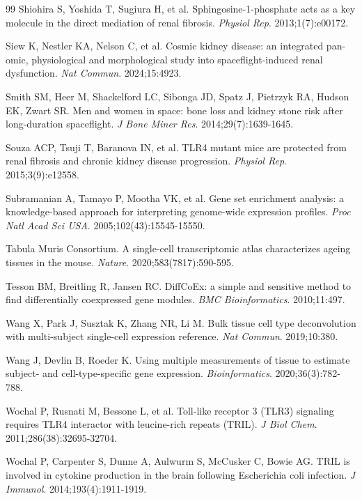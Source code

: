 \documentclass[11pt]{article}
\begin{document}
\begin{thebibliography}{99}
 Shiohira S, Yoshida T, Sugiura H, et al. Sphingosine-1-phosphate acts as a key molecule in the direct mediation of renal fibrosis. \emph{Physiol Rep}. 2013;1(7):e00172.

 Siew K, Nestler KA, Nelson C, et al. Cosmic kidney disease: an integrated pan-omic, physiological and morphological study into spaceflight-induced renal dysfunction. \emph{Nat Commun}. 2024;15:4923.

 Smith SM, Heer M, Shackelford LC, Sibonga JD, Spatz J, Pietrzyk RA, Hudson EK, Zwart SR. Men and women in space: bone loss and kidney stone risk after long-duration spaceflight. \emph{J Bone Miner Res}. 2014;29(7):1639-1645.

 Souza ACP, Tsuji T, Baranova IN, et al. TLR4 mutant mice are protected from renal fibrosis and chronic kidney disease progression. \emph{Physiol Rep}. 2015;3(9):e12558.

 Subramanian A, Tamayo P, Mootha VK, et al. Gene set enrichment analysis: a knowledge-based approach for interpreting genome-wide expression profiles. \emph{Proc Natl Acad Sci USA}. 2005;102(43):15545-15550.

 Tabula Muris Consortium. A single-cell transcriptomic atlas characterizes ageing tissues in the mouse. \emph{Nature}. 2020;583(7817):590-595.

 Tesson BM, Breitling R, Jansen RC. DiffCoEx: a simple and sensitive method to find differentially coexpressed gene modules. \emph{BMC Bioinformatics}. 2010;11:497.

 Wang X, Park J, Susztak K, Zhang NR, Li M. Bulk tissue cell type deconvolution with multi-subject single-cell expression reference. \emph{Nat Commun}. 2019;10:380.

 Wang J, Devlin B, Roeder K. Using multiple measurements of tissue to estimate subject- and cell-type-specific gene expression. \emph{Bioinformatics}. 2020;36(3):782-788.

 Wochal P, Rusnati M, Bessone L, et al. Toll-like receptor 3 (TLR3) signaling requires TLR4 interactor with leucine-rich repeats (TRIL). \emph{J Biol Chem}. 2011;286(38):32695-32704.

 Wochal P, Carpenter S, Dunne A, Aulwurm S, McCusker C, Bowie AG. TRIL is involved in cytokine production in the brain following Escherichia coli infection. \emph{J Immunol}. 2014;193(4):1911-1919.


\end{thebibliography}
\end{document}

